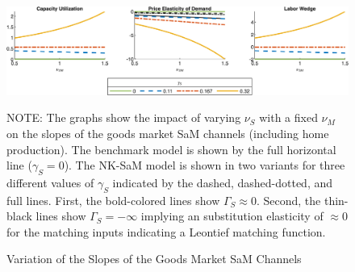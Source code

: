 \documentclass[12pt,3p,authoryear,review]{elsarticle}
\begin{document}
\begin{figure}[t]%
	\centering%
	\caption{Variation of the Slopes of the Goods Market SaM Channels}\label{fig:slopes_5eq_util}%
	\includegraphics[width=\textwidth]{fig_2_slopes_5eq_ps_cu_okun.png}\\%
	{\tiny \singlespacing NOTE: The graphs show the impact of varying $\nu_S$ with a fixed $\nu_M$ on the slopes of the goods market SaM channels (including home production). The benchmark model is shown by the full horizontal line ($\gamma_S=0$). The NK-SaM model is shown in two variants for three different values of $\gamma_S$ indicated by the dashed, dashed-dotted, and full lines. First, the bold-colored lines show $\Gamma_S \approx 0$. Second, the thin-black lines show $\Gamma_S=-\infty$ implying an substitution elasticity of $\approx 0$ for the matching inputs indicating a Leontief matching function.\par}%
\end{figure}%
\end{document}
